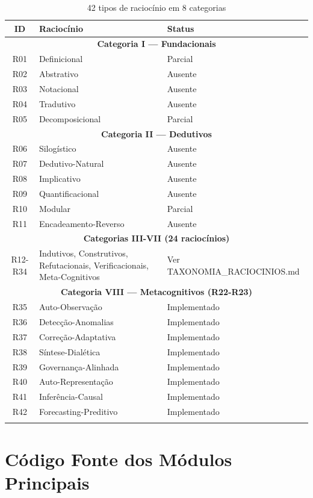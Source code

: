 \documentclass[12pt,a4paper,oneside]{abntex2}
\begin{document}
\begin{apendicesenv}
\begin{longtable}{cp{7.5cm}p{5.5cm}}
\toprule
\textbf{ID} & \textbf{Raciocínio} & \textbf{Status} \\
\midrule
\multicolumn{3}{c}{\textbf{Categoria I — Fundacionais}} \\
R01 & Definicional & Parcial \\
R02 & Abstrativo & Ausente \\
R03 & Notacional & Ausente \\
R04 & Tradutivo & Ausente \\
R05 & Decomposicional & Parcial \\
\midrule
\multicolumn{3}{c}{\textbf{Categoria II — Dedutivos}} \\
R06 & Silogístico & Ausente \\
R07 & Dedutivo-Natural & Ausente \\
R08 & Implicativo & Ausente \\
R09 & Quantificacional & Ausente \\
R10 & Modular & Parcial \\
R11 & Encadeamento-Reverso & Ausente \\
\midrule
\multicolumn{3}{c}{\textbf{Categorias III-VII (24 raciocínios)}} \\
R12-R34 & Indutivos, Construtivos, Refutacionais, Verificacionais, Meta-Cognitivos & Ver TAXONOMIA\_RACIOCINIOS.md \\
\midrule
\multicolumn{3}{c}{\textbf{Categoria VIII — Metacognitivos (R22-R23)}} \\
R35 & Auto-Observação & Implementado \\
R36 & Detecção-Anomalias & Implementado \\
R37 & Correção-Adaptativa & Implementado \\
R38 & Síntese-Dialética & Implementado \\
R39 & Governança-Alinhada & Implementado \\
R40 & Auto-Representação & Implementado \\
R41 & Inferência-Causal & Implementado \\
R42 & Forecasting-Preditivo & Implementado \\
\bottomrule
\caption{42 tipos de raciocínio em 8 categorias}
\end{longtable}

\chapter{Código Fonte dos Módulos Principais}


\end{apendicesenv}
\end{document}
